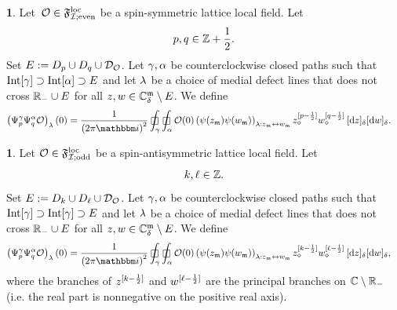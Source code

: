 \documentclass[12pt,oneside,english]{amsart}
\numberwithin{equation}{section}
\numberwithin{figure}{section}
\theoremstyle{plain}
\theoremstyle{plain}
\theoremstyle{plain}
\theoremstyle{plain}
\theoremstyle{remark}
\theoremstyle{definition}
\newtheorem{defn}[thm]{\protect\definitionname}
\theoremstyle{plain}
\theoremstyle{plain}
\numberwithin{thm}{section}
\providecommand{\definitionname}{Definition}
\providecommand{\definitionname}{Definition}
\providecommand{\definitionname}{Definition}
\providecommand{\definitionname}{Definition}
\begin{document}
\begin{defn}
Let~${\mathcal{O}} \in \mathfrak{F}^\mathrm{loc}_{\mathcal{I}; \mathrm{even}}$ be a spin-symmetric
lattice local field. 
Let \[ p,q\in\mathbb{Z} +\frac{1}{2} . \]
Set $E := D_{p}\cup D_{q}\cup {\mathcal{D}}_{{\mathcal{O}}}$. Let 
$\gamma, \alpha$ be counterclockwise closed paths such that 
$\mathrm{Int}[{\gamma}] \supset \mathrm{Int}[{\alpha}] \supset E$
and let ${\lambda}$
be a choice of medial defect
lines that does not cross $ \mathbb{R}_{-}\cup E$ for all
$z,w \in {\mathbb{C}_{{\delta}}^{\mathfrak{m}}} \setminus E$.
We define
\begin{align*}
\left( \fermmode^{\contour}_{p} \fermmode^{\contourbis}_{q}
    \genoper \right)_{\cordefline} (0) 
= \; & \frac{1}{\left(2\pi \ii \right)^{2}}
  \dcint{\contour} \dcint{\contourbis} \genoper
  (0) \left(\ferm(z_{\mdl})  \ferm(w_{\mdl}) \right)_{
  \cordefline : z_{\mdl}\leftrightarrow w_{\mdl}} 
	\dmon{z_{\dmd}}{p-\frac{1}{2}}
    \dmon{w_{\dmd}}{q-\frac{1}{2}}
  \, \dd{z} \dd{w} .
\end{align*}
\end{defn}
\begin{defn}
Let ${\mathcal{O}}\in \mathfrak{F}^\mathrm{loc}_{\mathcal{I}; \mathrm{odd}}$ be a spin-antisymmetric lattice local 
field. Let
\[ k , \ell\in\mathbb{Z} .\]
Set $E := D_{k} \cup D_{\ell} \cup 
{\mathcal{D}}_{{\mathcal{O}}}$.
Let $\gamma,\alpha$ be counterclockwise closed paths such that 
$\mathrm{Int}[{\gamma}] \supset \mathrm{Int}[{\gamma}] \supset E$
and let ${\lambda}$ be a choice of medial defect
lines that does not cross $ \mathbb{R}_{-} \cup E$ for all
$z,w \in {\mathbb{C}_{{\delta}}^{\mathfrak{m}}} \setminus E$.
We define
\begin{align*}
\left( \fermmode_{p}^{\contour}\fermmode_{q}^{\contourbis} \genoper 
\right)_{\cordefline}(0) 
= \; & \frac{1}{\left(2\pi \ii \right)^{2}}
    \dcint{\contour} \dcint{\contourbis} \genoper (0) 
  \left(\ferm(z_{\mdl})  \ferm(w_{\mdl}) \right)_{ 
  \cordefline : z_{\mdl}\leftrightarrow w_{\mdl}}
	\dhimon{z_{\dmd}}{k-\frac{1}{2}}
	\dhimon{w_{\dmd}}{\ell-\frac{1}{2}}
  \, \dd{z} \dd{w},
\end{align*}
where the branches of ${z^{[{k-\frac{1}{2}}]}}$ and 
${w^{[{\ell-\frac{1}{2}}]}}$
are the principal branches on $ \mathbb{C} \setminus \mathbb{R}_{-}$
(i.e. the real part is nonnegative on the positive real axis).
\end{defn}
\end{document}
